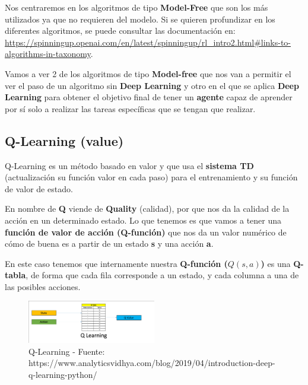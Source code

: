 \documentclass[
  a4paper,
  DIV=11,
  numbers=noendperiod]{scrreprt}
\begin{document}
Nos centraremos en los algoritmos de tipo \textbf{Model-Free} que son
los más utilizados ya que no requieren del modelo. Si se quieren
profundizar en los diferentes algoritmos, se puede consultar las
documentación en:
\url{https://spinningup.openai.com/en/latest/spinningup/rl_intro2.html\#links-to-algorithms-in-taxonomy}.

Vamos a ver 2 de los algoritmos de tipo \textbf{Model-free} que nos van
a permitir el ver el paso de un algoritmo sin \textbf{Deep Learning} y
otro en el que se aplica \textbf{Deep Learning} para obtener el objetivo
final de tener un \textbf{agente} capaz de aprender por sí solo a
realizar las tareas específicas que se tengan que realizar.

\hypertarget{q-learning-value}{%
\subsection{Q-Learning (value)}\label{q-learning-value}}

Q-Learning es un método basado en valor y que usa el \textbf{sistema TD}
(actualización su función valor en cada paso) para el entrenamiento y su
función de valor de estado.

En nombre de \textbf{Q} viende de \textbf{Quality} (calidad), por que
nos da la calidad de la acción en un determinado estado. Lo que tenemos
es que vamos a tener una \textbf{función de valor de acción (Q-función)}
que nos da un valor numérico de cómo de buena es a partir de un estado
\textbf{s} y una acción \textbf{a}.

En este caso tenemos que internamente nuestra \textbf{Q-función
(}\(Q(s,a)\)\textbf{)} es una \textbf{Q-tabla}, de forma que cada fila
corresponde a un estado, y cada columna a una de las posibles acciones.

\begin{figure}

{\centering \includegraphics[width=0.5\textwidth,height=\textheight]{imagenes/reinforcement_learning/rl_qlearning.png}

}

\caption{Q-Learning - Fuente:
https://www.analyticsvidhya.com/blog/2019/04/introduction-deep-q-learning-python/}

\end{figure}
\end{document}
